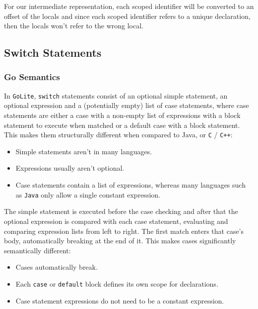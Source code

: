 \documentclass[11pt]{article}
\begin{document}
For our intermediate representation, each scoped identifier will
be converted to an offset of the locals and since each scoped
identifier refers to a unique declaration, then the locals won't
refer to the wrong local.
\subsection{Switch Statements}
\label{sec:orgb1a4b2a}
\subsubsection{Go Semantics}
\label{sec:orga55da9a}
In \texttt{GoLite}, \texttt{switch} statements consist of an optional simple
statement, an optional expression and a (potentially empty) list
of case statements, where case statements are either a case with a
non-empty list of expressions with a block statement to execute
when matched or a default case with a block statement. This makes
them structurally different when compared to Java, or \texttt{C} / \texttt{C++}:
\begin{itemize}
\item Simple statements aren't in many languages.
\item Expressions usually aren't optional.
\item Case statements contain a list of expressions, whereas many
languages such as \texttt{Java} only allow a single constant expression.
\end{itemize}
The simple statement is executed before the case checking and
after that the optional expression is compared with each case
statement, evaluating and comparing expression lists from left to
right. The first match enters that case's body, automatically
breaking at the end of it. This makes cases significantly semantically different:
\begin{itemize}
\item Cases automatically break.
\item Each \texttt{case} or \texttt{default} block defines its own scope for declarations.
\item Case statement expressions do not need to be a constant expression.
\end{itemize}
\end{document}
